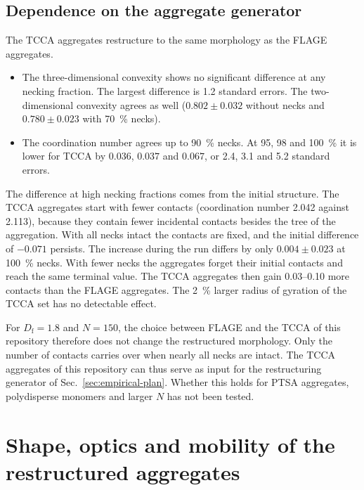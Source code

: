 \documentclass[11pt,a4paper]{article}
\newcommand{\Df}{D_\text{f}}
\begin{document}
\subsection{Dependence on the aggregate generator}

The TCCA aggregates restructure to the same morphology as the FLAGE aggregates.
\begin{itemize}
  \item The three-dimensional convexity shows no significant difference at any necking fraction.
        The largest difference is 1.2 standard errors.
        The two-dimensional convexity agrees as well ($0.802 \pm 0.032$ without necks and $0.780 \pm 0.023$ with \SI{70}{\percent} necks).
  \item The coordination number agrees up to \SI{90}{\percent} necks.
        At 95, 98 and \SI{100}{\percent} it is lower for TCCA by $0.036$, $0.037$ and $0.067$, or 2.4, 3.1 and 5.2 standard errors.
\end{itemize}
The difference at high necking fractions comes from the initial structure.
The TCCA aggregates start with fewer contacts (coordination number 2.042 against 2.113), because they contain fewer incidental contacts besides the tree of the aggregation.
With all necks intact the contacts are fixed, and the initial difference of $-0.071$ persists.
The increase during the run differs by only $0.004 \pm 0.023$ at \SI{100}{\percent} necks.
With fewer necks the aggregates forget their initial contacts and reach the same terminal value.
The TCCA aggregates then gain 0.03--0.10 more contacts than the FLAGE aggregates.
The \SI{2}{\percent} larger radius of gyration of the TCCA set has no detectable effect.

For $\Df = 1.8$ and $N = 150$, the choice between FLAGE and the TCCA of this repository therefore does not change the restructured morphology.
Only the number of contacts carries over when nearly all necks are intact.
The TCCA aggregates of this repository can thus serve as input for the restructuring generator of Sec.~\ref{sec:empirical-plan}.
Whether this holds for PTSA aggregates, polydisperse monomers and larger $N$ has not been tested.

\section{Shape, optics and mobility of the restructured aggregates}
\label{sec:shape-optics}
\end{document}
